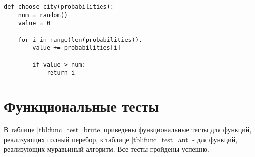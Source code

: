 \begin{center}
\captionsetup{justification=raggedright,singlelinecheck=off}
\begin{lstlisting}[label=lst:choose,caption=Алгоритм выбора города случайным образом]
def choose_city(probabilities):
    num = random()
    value = 0

    for i in range(len(probabilities)):
        value += probabilities[i]

        if value > num:
            return i
\end{lstlisting}
\end{center}

\section{Функциональные тесты}

В таблице \ref{tbl:func_test_brute} приведены функциональные тесты для функций, реализующих полный перебор, в таблице \ref{tbl:func_test_ant} - для функций, реализующих муравьиный алгоритм. Все тесты пройдены успешно.

